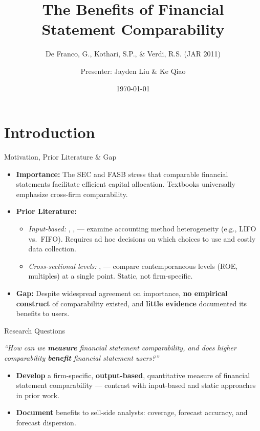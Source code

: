 \documentclass[aspectratio=169,xcolor=dvipsnames]{beamer}
\title[Benefits of Fin. Stmt. Comparability]{The Benefits of Financial Statement Comparability}
\subtitle{De Franco, G., Kothari, S.P., \& Verdi, R.S. (JAR 2011)}
\author[Jayden Liu]{Presenter: Jayden Liu \& Ke Qiao}
\institute
{
    School of Accounting and Finance, HK PolyU %
}
\date{\today} %
\begin{document}
\begin{frame}
    \titlepage
\end{frame}


\section{Introduction}

\begin{frame}{Motivation, Prior Literature \& Gap}
    \begin{itemize}
        \item \textbf{Importance:} The SEC \citeyearpar{sec2000} and FASB \citeyearpar{fasb1980} stress that comparable financial statements facilitate efficient capital allocation. Textbooks universally emphasize cross-firm comparability.
        \item \textbf{Prior Literature:}
        \begin{itemize}
            \item \textit{Input-based:} \citet{bradshaw2008harmonizing}, \citet{defond2003empirical}, \citet{bradshaw2009accounting} --- examine accounting method heterogeneity (e.g., LIFO vs.\ FIFO). Requires ad hoc decisions on which choices to use and costly data collection.
            \item \textit{Cross-sectional levels:} \citet{joos1994effects}, \citet{land2002empirical} --- compare contemporaneous levels (ROE, multiples) at a single point. Static, not firm-specific.
        \end{itemize}
        \item \textbf{Gap:} Despite widespread agreement on importance, \textcolor{hkustred}{\textbf{no empirical construct}} of comparability existed, and \textcolor{hkustred}{\textbf{little evidence}} documented its benefits to users.
    \end{itemize}
\end{frame}


\begin{frame}{Research Questions}
    \vspace{0.5cm}
    \begin{center}
        \Large \textit{``How can we \textbf{measure} financial statement comparability, and does higher comparability \textbf{benefit} financial statement users?''}
    \end{center}
    \vspace{0.5cm}
    \begin{itemize}
        \item \textbf{Develop} a firm-specific, \textcolor{hkustred}{\textbf{output-based}}, quantitative measure of financial statement comparability --- contrast with input-based and static approaches in prior work.
        \item \textbf{Document} benefits to sell-side analysts: coverage, forecast accuracy, and forecast dispersion.
    \end{itemize}
\end{frame}
\end{document}

